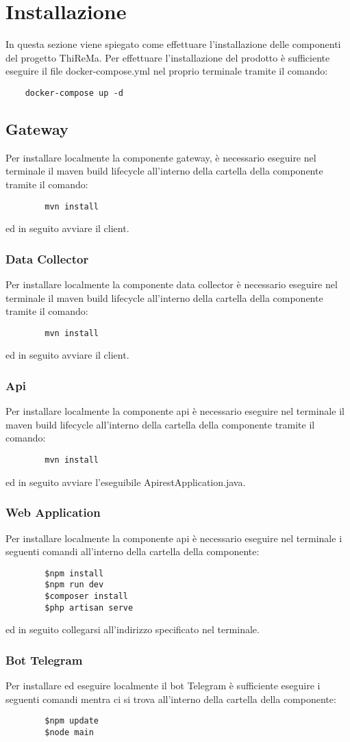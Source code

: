 \section{Installazione}
	In questa sezione viene spiegato come effettuare l'installazione delle componenti del progetto ThiReMa.
	Per effettuare l'installazione del prodotto è sufficiente eseguire il file docker-compose.yml nel proprio terminale tramite il comando:
	\begin{verbatim}
	docker-compose up -d
	\end{verbatim}

	\subsection{Gateway}
		Per installare localmente la componente gateway, è necessario eseguire nel terminale il maven build lifecycle all'interno della cartella della componente tramite il comando:
		\begin{verbatim}
		mvn install
		\end{verbatim}
		ed in seguito avviare il client.

	\subsubsection{Data Collector}
		Per installare localmente la componente data collector è necessario eseguire nel terminale il maven build lifecycle all'interno della cartella della componente tramite il comando:
		\begin{verbatim}
		mvn install
		\end{verbatim}
		ed in seguito avviare il client.

	\subsubsection{Api}
		Per installare localmente la componente api è necessario eseguire nel terminale il maven build lifecycle all'interno della cartella della componente tramite il comando:
		\begin{verbatim}
		mvn install
		\end{verbatim}
		ed in seguito avviare l'eseguibile ApirestApplication.java.

	\subsubsection{Web Application}
		Per installare localmente la componente api è necessario eseguire nel terminale i seguenti comandi all'interno della cartella della componente:
		\begin{verbatim}
		$npm install
		$npm run dev
		$composer install
		$php artisan serve
		\end{verbatim}
		ed in seguito collegarsi all'indirizzo specificato nel terminale.
	\subsubsection{Bot Telegram}
		Per installare ed eseguire localmente il bot Telegram è sufficiente eseguire i seguenti comandi mentra ci si trova all'interno della cartella della componente:
		\begin{verbatim}
		$npm update
		$node main
		\end{verbatim}
		
